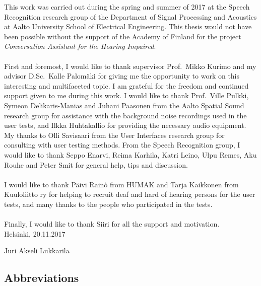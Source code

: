 \documentclass[english, 12pt, a4paper, pdftex, elec, utf8]{aaltothesis}
\begin{document}
This work was carried out during the spring and summer of 2017 at the Speech Recognition research group of the Department of Signal Processing and Acoustics at Aalto University School of Electrical Engineering. This thesis would not have been possible without the support of the Academy of Finland for the project \textit{Conversation Assistant for the Hearing Impaired}. \\\\
First and foremost, I would like to thank supervisor Prof.\ Mikko Kurimo and my advisor D.Sc.\ Kalle Palomäki for giving me the opportunity to work on this interesting and multifaceted topic. I am grateful for the freedom and continued support given to me during this work. I would like to thank Prof.\ Ville Pulkki, Symeon Delikaris-Manias and Juhani Paasonen from the Aalto Spatial Sound research group for assistance with the background noise recordings used in the user tests, and Ilkka Huhtakallio for providing the necessary audio equipment. My thanks to Olli Savisaari from the User Interfaces research group for consulting with user testing methods. From the Speech Recognition group, I would like to thank Seppo Enarvi, Reima Karhila, Katri Leino, Ulpu Remes, Aku Rouhe and Peter Smit for general help, tips and discussion. \\\\
I would like to thank Päivi Rainò from HUMAK and Tarja Kaikkonen from Kuuloliitto ry for helping to recruit deaf and hard of hearing persons for the user tests, and many thanks to the people who participated in the tests. \\\\
Finally, I would like to thank Siiri for all the support and motivation. \\

\vspace{1cm}
\noindent Helsinki, 20.11.2017

\vspace{5mm}
\noindent Juri Akseli Lukkarila

\newpage

\thesistableofcontents


\subsection*{Abbreviations}
\end{document}
